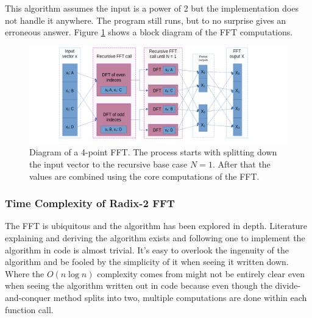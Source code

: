 


This algorithm assumes the input is a power of 2 but the implementation does not handle it anywhere. The program still runs, but to no surprise gives an erroneous answer. Figure \ref{fig:FFT-Alg} shows a block diagram of the FFT computations.

\begin{figure}[ht]
    \centering
    \includegraphics[width=\textwidth]{./images/fft.png}
    \caption{Diagram of a 4-point FFT. The process starts with splitting down the input vector to the recursive base case $N=1$. After that the values are combined using the core computations of the FFT.\label{fig:FFT-Alg}}
\end{figure}

\subsubsection{Time Complexity of Radix-2 FFT}
The FFT is ubiquitous and the algorithm has been explored in depth. Literature explaining and deriving the algorithm exists and following one to implement the algorithm in code is almost trivial. It's easy to overlook the ingenuity of the algorithm and be fooled by the simplicity of it when seeing it written down. Where the $O(n\log n)$ complexity comes from might not be entirely clear even when seeing the algorithm written out in code because even though the divide-and-conquer method splits into two, multiple computations are done within each function call. 

